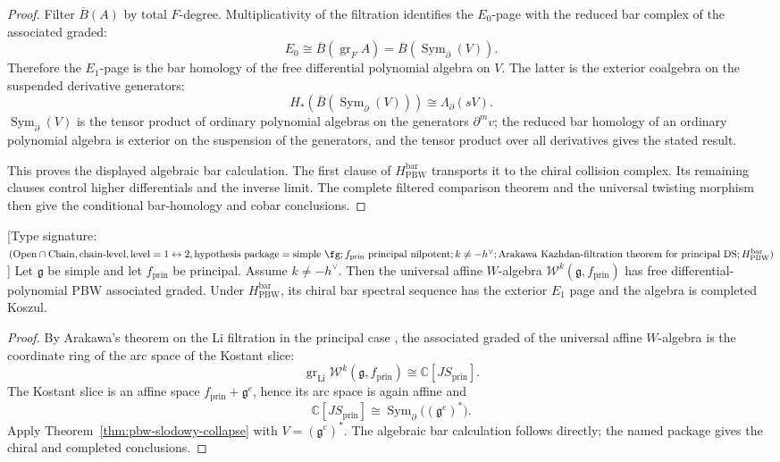 \begin{proof}
Filter $\overline B(A)$ by total $F$-degree. Multiplicativity of the
filtration identifies the $E_0$-page with the reduced bar complex of the
associated graded:
\[
E_0 \cong \overline B(\operatorname{gr}_F A)
= \overline B(\operatorname{Sym}_{\partial}(V)).
\]
Therefore the $E_1$-page is the bar homology of the free differential polynomial
algebra on $V$. The latter is the exterior coalgebra on the suspended
derivative generators:
\[
H_*\!\left(\overline B(\operatorname{Sym}_{\partial}(V))\right)
\cong \Lambda_{\partial}(sV).
\]
$\operatorname{Sym}_{\partial}(V)$ is the tensor product of ordinary
polynomial algebras on the generators $\partial^m v$; the reduced bar homology
of an ordinary polynomial algebra is exterior on the suspension of the
generators, and the tensor product over all derivatives gives the stated result.

This proves the displayed algebraic bar calculation.  The first clause of
$H_{\mathrm{PBW}}^{\mathrm{bar}}$ transports it to the chiral collision
complex.  Its remaining clauses control higher differentials and the inverse
limit.  The complete filtered comparison theorem and the universal twisting
morphism then give the conditional bar-homology and cobar conclusions.
\end{proof}

\begin{corollary}
\label{cor:principal-w-completed-koszul}
\textup{[}Type signature:
$(\mathrm{Open}\cap\mathrm{Chain},\mathrm{chain\text{-}level},
\mathrm{level}=1\leftrightarrow 2,
\mathrm{hypothesis\ package}=\mathrm{simple\ }\fg;
f_{\mathrm{prin}}\mathrm{\ principal\ nilpotent};
k\ne -h^\vee;
\mathrm{Arakawa\ Kazhdan\text{-}filtration\ theorem\ for\ principal\ DS};
H_{\mathrm{PBW}}^{\mathrm{bar}})$\textup{]}
Let $\mathfrak g$ be simple and let $f_{\mathrm{prin}}$ be principal. Assume
$k\neq -h^\vee$. Then the universal affine $W$-algebra
$\mathcal W^k(\mathfrak g,f_{\mathrm{prin}})$ has free differential-polynomial
PBW associated graded.  Under $H_{\mathrm{PBW}}^{\mathrm{bar}}$, its chiral
bar spectral sequence has the exterior $E_1$ page and the algebra is completed
Koszul.
\end{corollary}

\begin{proof}
By Arakawa's theorem on the Li filtration in the principal case
\cite{Arakawa07}, the associated
graded of the universal affine $W$-algebra is the coordinate ring of the arc
space of the Kostant slice:
\[
\operatorname{gr}_{\mathrm{Li}}\mathcal W^k(\mathfrak g,f_{\mathrm{prin}})
\cong \mathbb C[J S_{\mathrm{prin}}].
\]
The Kostant slice is an affine space $f_{\mathrm{prin}}+\mathfrak g^e$, hence
its arc space is again affine and
\[
\mathbb C[J S_{\mathrm{prin}}]
\cong \operatorname{Sym}_{\partial}\bigl((\mathfrak g^e)^*\bigr).
\]
Apply Theorem~\ref{thm:pbw-slodowy-collapse} with
$V=(\mathfrak g^e)^*$.  The algebraic bar calculation follows directly; the
named package gives the chiral and completed conclusions.
\end{proof}

